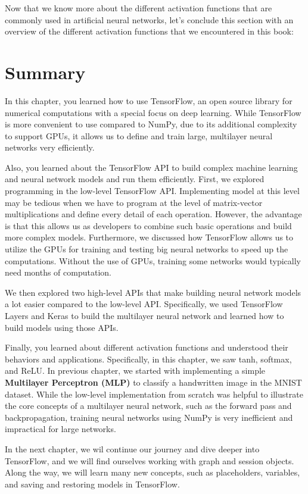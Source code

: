 \documentclass[11pt]{article}
\begin{document}
Now that we know more about the different activation functions that are
commonly used in artificial neural networks, let's conclude this section
with an overview of the different activation functions that we
encountered in this book:

    \section{Summary}\label{summary}

    In this chapter, you learned how to use TensorFlow, an open source
library for numerical computations with a special focus on deep
learning. While TensorFlow is more convenient to use compared to NumPy,
due to its additional complexity to support GPUs, it allows us to define
and train large, multilayer neural networks very efficiently.

Also, you learned about the TensorFlow API to build complex machine
learning and neural network models and run them efficiently. First, we
explored programming in the low-level TensorFlow API. Implementing model
at this level may be tedious when we have to program at the level of
matrix-vector multiplications and define every detail of each operation.
However, the advantage is that this allows us as developers to combine
such basic operations and build more complex models. Furthermore, we
discussed how TensorFlow allows us to utilize the GPUs for training and
testing big neural networks to speed up the computations. Without the
use of GPUs, training some networks would typically need months of
computation.

We then explored two high-level APIs that make building neural network
models a lot easier compared to the low-level API. Specifically, we used
TensorFlow Layers and Keras to build the multilayer neural network and
learned how to build models using those APIs.

Finally, you learned about different activation functions and understood
their behaviors and applications. Specifically, in this chapter, we saw
tanh, softmax, and ReLU. In previous chapter, we started with
implementing a simple \textbf{Multilayer Perceptron (MLP)} to classify a
handwritten image in the MNIST dataset. While the low-level
implementation from scratch was helpful to illustrate the core concepts
of a multilayer neural network, such as the forward pass and
backpropagation, training neural networks using NumPy is very
inefficient and impractical for large networks.

In the next chapter, we wil continue our journey and dive deeper into
TensorFlow, and we will find ourselves working with graph and session
objects. Along the way, we will learn many new concepts, such as
placeholders, variables, and saving and restoring models in TensorFlow.


    
    
    
    
\end{document}
